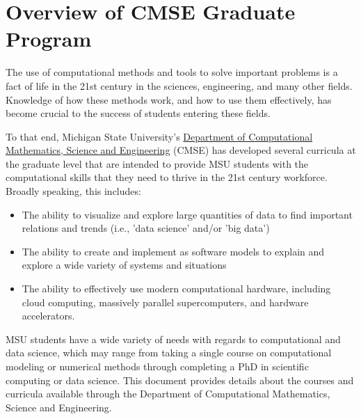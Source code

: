 \section{Overview of CMSE Graduate Program}
\label{sec:overview}

The use of computational methods and tools to solve important problems
is a fact of life in the 21st century in the sciences, engineering,
and many other fields.  Knowledge of how these methods work, and how
to use them effectively, has become crucial to the success of students
entering these fields.

To that end, Michigan State University's \href{http://cmse.msu.edu}{Department of Computational
Mathematics, Science and Engineering} (CMSE) has developed several
curricula at the graduate level that are intended to provide MSU
students with the computational skills that they need to thrive in the
21st century workforce.  Broadly speaking, this includes:

\begin{itemize}
\item The ability to visualize and explore large quantities of data to
  find important relations and trends (i.e., 'data science' and/or
  'big data')

\item The ability to create and implement as software models to
  explain and explore a wide variety of systems and situations

\item The ability to effectively use modern computational hardware,
  including cloud computing, massively parallel supercomputers, and
  hardware accelerators.

\end{itemize}

MSU students have a wide variety of needs with regards to
computational and data science, which may range from taking a single
course on computational modeling or numerical methods through
completing a PhD in scientific computing or data science.  This
document provides details about the courses and curricula available
through the Department of Computational Mathematics, Science and
Engineering.
